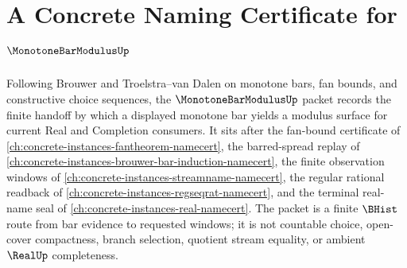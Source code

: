 \chapter{A Concrete Naming Certificate for $\MonotoneBarModulusUp$}
\label{ch:concrete-instances-monotone-bar-modulus-namecert}

Following Brouwer and Troelstra--van Dalen on monotone bars, fan bounds, and constructive choice sequences, the $\MonotoneBarModulusUp$ packet records the finite handoff by which a displayed monotone bar yields a modulus surface for current Real and Completion consumers. It sits after the fan-bound certificate of \autoref{ch:concrete-instances-fantheorem-namecert}, the barred-spread replay of \autoref{ch:concrete-instances-brouwer-bar-induction-namecert}, the finite observation windows of \autoref{ch:concrete-instances-streamname-namecert}, the regular rational readback of \autoref{ch:concrete-instances-regseqrat-namecert}, and the terminal real-name seal of \autoref{ch:concrete-instances-real-namecert}. The packet is a finite $\BHist$ route from bar evidence to requested windows; it is not countable choice, open-cover compactness, branch selection, quotient stream equality, or ambient $\RealUp$ completeness.

